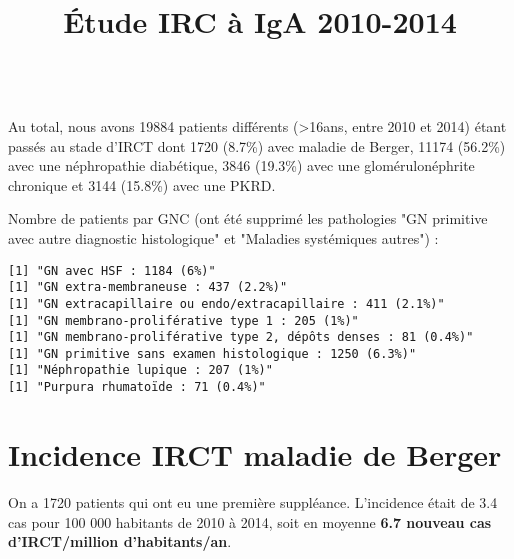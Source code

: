 \documentclass[11pt,a4paper]{article}\usepackage[]{graphicx}\usepackage[]{color}
\title{Étude IRC à IgA 2010-2014}
\makeatletter
\newenvironment{kframe}{%
 \def\at@end@of@kframe{}%
 \ifinner\ifhmode%
  \def\at@end@of@kframe{\end{minipage}}%
  \begin{minipage}{\columnwidth}%
 \fi\fi%
 \def\FrameCommand##1{\hskip\@totalleftmargin \hskip-\fboxsep
 \colorbox{shadecolor}{##1}\hskip-\fboxsep
     \hskip-\linewidth \hskip-\@totalleftmargin \hskip\columnwidth}%
 \MakeFramed {\advance\hsize-\width
   \@totalleftmargin\z@ \linewidth\hsize
   \@setminipage}}%
 {\par\unskip\endMakeFramed%
 \at@end@of@kframe}
\newenvironment{knitrout}{}{} %
\makeatother
\begin{document}
\maketitle

\tableofcontents
~\\























Au total, nous avons 19884 patients différents (\textgreater 16ans, entre 2010 et 2014) étant passés au stade d'IRCT dont 1720 (8.7\%) avec maladie de Berger, 11174 (56.2\%) avec une néphropathie diabétique, 3846 (19.3\%) avec une glomérulonéphrite chronique et 3144 (15.8\%) avec une PKRD.

Nombre de patients par GNC (ont été supprimé les pathologies "GN primitive avec autre diagnostic histologique" et "Maladies systémiques autres") :

\begin{knitrout}
\color{fgcolor}\begin{kframe}
\begin{verbatim}
[1] "GN avec HSF : 1184 (6%)"
[1] "GN extra-membraneuse : 437 (2.2%)"
[1] "GN extracapillaire ou endo/extracapillaire : 411 (2.1%)"
[1] "GN membrano-proliférative type 1 : 205 (1%)"
[1] "GN membrano-proliférative type 2, dépôts denses : 81 (0.4%)"
[1] "GN primitive sans examen histologique : 1250 (6.3%)"
[1] "Néphropathie lupique : 207 (1%)"
[1] "Purpura rhumatoïde : 71 (0.4%)"
\end{verbatim}
\end{kframe}
\end{knitrout}

\section{Incidence IRCT maladie de Berger}



On a 1720 patients qui ont eu une première suppléance. L'incidence était de 3.4 cas pour 100 000 habitants de 2010 à 2014, soit en moyenne \textbf{6.7 nouveau cas d'IRCT/million d'habitants/an}. 
\end{document}
